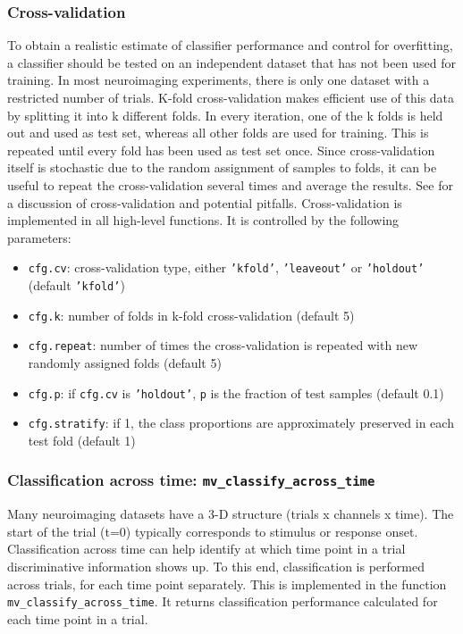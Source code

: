 \documentclass[utf8]{frontiersSCNS} %
\newcommand{\ttt}[1]{\texttt{#1}}
\begin{document}
\subsubsection{Cross-validation}

To obtain a realistic estimate of classifier performance and control for overfitting, a classifier should be tested on an independent dataset that has not been used for training. In most neuroimaging experiments, there is only one dataset with a restricted number of trials. K-fold cross-validation makes efficient use of this data by splitting it into k different folds. In every iteration, one of the k folds is held out and used as test set, whereas all other folds are used for training. This is repeated until every fold has been used as test set once. Since cross-validation itself is stochastic due to the random assignment of samples to folds, it can be useful to repeat the cross-validation several times and average the results. See \cite{Lemm2011} for a discussion of cross-validation and potential pitfalls. Cross-validation is implemented in all high-level functions. It is controlled by the following parameters:

\begin{itemize}
    \item \ttt{cfg.cv}: cross-validation type, either \ttt{'kfold'}, \ttt{'leaveout'} or \ttt{'holdout'} (default \ttt{'kfold'})
    \item \ttt{cfg.k}: number of folds in k-fold cross-validation (default 5)
    \item \ttt{cfg.repeat}: number of times the cross-validation is repeated with new randomly assigned folds (default 5)
    \item \ttt{cfg.p}: if \ttt{cfg.cv} is \ttt{'holdout'}, \ttt{p} is the fraction of test samples (default 0.1)
    \item \ttt{cfg.stratify}: if 1, the class proportions are approximately preserved in each test fold (default 1)
\end{itemize}


\subsubsection{Classification across time: \ttt{mv\_classify\_across\_time}}

Many neuroimaging datasets have a 3-D structure (trials x channels x time). The start of the trial (t=0) typically corresponds to stimulus or response onset. Classification across time can help identify at which time point in a trial discriminative information shows up. To this end, classification is performed across trials, for each time point separately. This is implemented in the function \ttt{mv\_classify\_across\_time}. It returns classification performance calculated for each time point in a trial.
\end{document}
